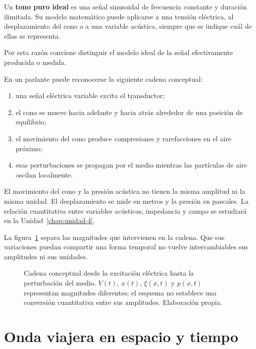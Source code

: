 Un \textbf{tono puro ideal} es una señal sinusoidal de frecuencia constante y
duración ilimitada. Su modelo matemático puede aplicarse a una tensión
eléctrica, al desplazamiento del cono o a una variable acústica, siempre que
se indique cuál de ellas se representa.

 Por esta razón conviene distinguir el modelo ideal de la
señal efectivamente producida o medida.

En un parlante puede reconocerse la siguiente cadena conceptual:

\begin{enumerate}
    \item una señal eléctrica variable excita el transductor;
    \item el cono se mueve hacia adelante y hacia atrás alrededor de una
    posición de equilibrio;
    \item el movimiento del cono produce compresiones y rarefacciones en el
    aire próximo;
    \item esas perturbaciones se propagan por el medio mientras las partículas
    de aire oscilan localmente.
\end{enumerate}

El movimiento del cono y la presión acústica no tienen la misma amplitud ni la
misma unidad. El desplazamiento se mide en metros y la presión en pascales. La
relación cuantitativa entre variables acústicas, impedancia y campo se
estudiará en la Unidad~\ref{chap:unidad-4}.

La figura~\ref{fig:u3-parlante-medio} separa las magnitudes que intervienen en
la cadena. Que sus variaciones puedan compartir una forma temporal no vuelve
intercambiables sus amplitudes ni sus unidades.

\begin{figure}[htbp]
    \centering
    
    \caption{Cadena conceptual desde la excitación eléctrica hasta la
    perturbación del medio. \(V(t)\), \(x(t)\), \(\xi(x,t)\) y \(p(x,t)\)
    representan magnitudes diferentes; el esquema no establece una conversión
    cuantitativa entre sus amplitudes. Elaboración propia.}
    \label{fig:u3-parlante-medio}
\end{figure}

\section{Onda viajera en espacio y tiempo}
\label{sec:u3-onda-viajera}

